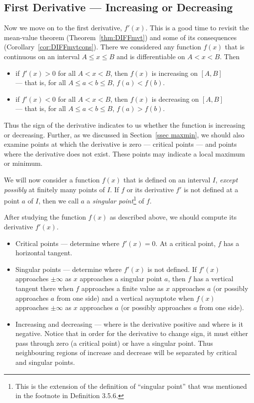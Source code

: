 \subsection{First Derivative --- Increasing or Decreasing}\label{ssec_sketch_FD}
Now we move on to the first derivative, $f'(x)$. This is a good time to revisit the
mean-value theorem (Theorem~\ref{thm:DIFFmvt}) and some of its consequences
(Corollary~\ref{cor:DIFFmvtcons}). There we considered any function $f(x)$ that is 
continuous on an interval $A\le x\le B$ and is differentiable on $A<x<B$. Then
\begin{itemize}
 \item if $f'(x)>0$ for all $A<x<B$, then $f(x)$ is increasing on $[A,B]$\\
  --- that is, for all $A\le a<b\le B$, $f(a)< f(b)$.
 \item if $f'(x)<0$ for all $A<x<B$, then $f(x)$ is decreasing on $[A,B]$\\
  --- that is, for all $A\le a<b\le B$, $f(a) > f(b)$.
\end{itemize}
Thus the sign of the derivative indicates to us whether the function is increasing or
decreasing. Further, as we discussed in Section~\ref{ssec maxmin}, we should also examine
points at which the derivative is zero --- critical points --- and points where the derivative
does not exist. These points may indicate a local maximum or minimum.

We will now consider a function $f(x)$ that is defined on an interval $I$, 
\emph{except possibly} at finitely many points of $I$. If $f$ or its derivative $f'$ 
is not defined at a point $a$ of $I$, then we call $a$ a 
\emph{singular point}\footnote{This is the extension of the definition of ``singular point'' that was mentioned in the footnote in Definition 3.5.6.} of $f$.

After studying the function $f(x)$ as described above, we should compute its derivative
$f'(x)$.
\begin{itemize}
 \item Critical points --- determine where $f'(x)=0$. At a critical point, $f$ has a
horizontal tangent.
 \item Singular points --- determine where $f'(x)$ is not defined.  If $f'(x)$
approaches $\pm\infty$ as $x$ approaches a singular point $a$, then $f$ has a
vertical tangent there when $f$ approaches a finite value as $x$ approaches $a$
(or possibly approaches $a$ from one side) and a vertical asymptote when $f(x)$
approaches $\pm\infty$ as $x$ approaches $a$ (or possibly approaches $a$ from
one side).

 \item Increasing and decreasing --- where is the derivative positive and where is it
negative. Notice that in order for the derivative to change sign, it must either pass
through zero (a critical point) or have a singular point. Thus neighbouring regions of
increase and decrease will be separated by critical and singular points.
\end{itemize}

